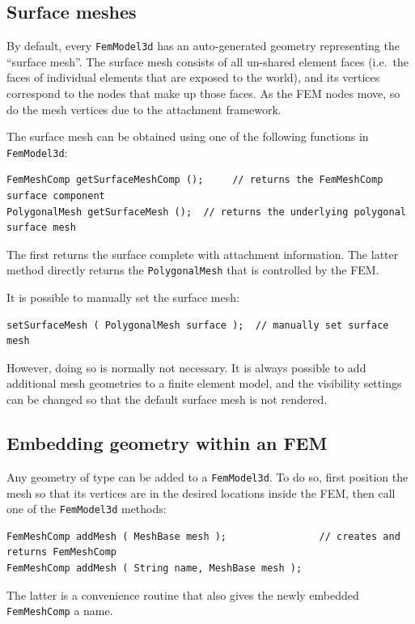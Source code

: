 \subsection{Surface meshes}

By default, every {\tt FemModel3d} has an auto-generated geometry representing
the ``surface mesh''.  The surface mesh consists of all un-shared element faces
(i.e.~the faces of individual elements that are exposed to the world), and its
vertices correspond to the nodes that make up those faces.  As the FEM nodes
move, so do the mesh vertices due to the attachment framework.

The surface mesh can be obtained using one of the following functions in 
{\tt FemModel3d}:
\begin{lstlisting}[]
FemMeshComp getSurfaceMeshComp ();     // returns the FemMeshComp surface component
PolygonalMesh getSurfaceMesh ();  // returns the underlying polygonal surface mesh
\end{lstlisting}
The first returns the surface complete with attachment information.  The latter 
method directly returns the {\tt PolygonalMesh} that is controlled by the FEM.  

It is possible to manually set the surface mesh:
\begin{lstlisting}[]
setSurfaceMesh ( PolygonalMesh surface );  // manually set surface mesh
\end{lstlisting}
However, doing so is normally not necessary.  It is always possible to add
additional mesh geometries to a finite element model, and the visibility
settings can be changed so that the default surface mesh is not rendered.  

\subsection{Embedding geometry within an FEM}

Any geometry of type  can be added to
a {\tt FemModel3d}.  To do so, first position the mesh so that its vertices 
are in the desired locations inside the FEM, then call one of the 
{\tt FemModel3d} methods:
\begin{lstlisting}[]
FemMeshComp addMesh ( MeshBase mesh );                // creates and returns FemMeshComp
FemMeshComp addMesh ( String name, MeshBase mesh );
\end{lstlisting}
The latter is a convenience routine that also gives the newly embedded
{\tt FemMeshComp} a name.

